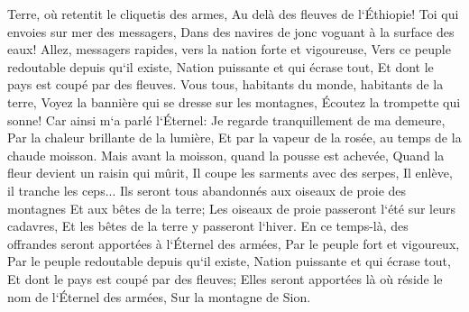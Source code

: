 \verse Terre, où retentit le cliquetis des armes, Au delà des fleuves de l`Éthiopie! 
\verse Toi qui envoies sur mer des messagers, Dans des navires de jonc voguant à la surface des eaux! Allez, messagers rapides, vers la nation forte et vigoureuse, Vers ce peuple redoutable depuis qu`il existe, Nation puissante et qui écrase tout, Et dont le pays est coupé par des fleuves. 
\verse Vous tous, habitants du monde, habitants de la terre, Voyez la bannière qui se dresse sur les montagnes, Écoutez la trompette qui sonne! 
\verse Car ainsi m`a parlé l`Éternel: Je regarde tranquillement de ma demeure, Par la chaleur brillante de la lumière, Et par la vapeur de la rosée, au temps de la chaude moisson. 
\verse Mais avant la moisson, quand la pousse est achevée, Quand la fleur devient un raisin qui mûrit, Il coupe les sarments avec des serpes, Il enlève, il tranche les ceps... 
\verse Ils seront tous abandonnés aux oiseaux de proie des montagnes Et aux bêtes de la terre; Les oiseaux de proie passeront l`été sur leurs cadavres, Et les bêtes de la terre y passeront l`hiver. 
\verse En ce temps-là, des offrandes seront apportées à l`Éternel des armées, Par le peuple fort et vigoureux, Par le peuple redoutable depuis qu`il existe, Nation puissante et qui écrase tout, Et dont le pays est coupé par des fleuves; Elles seront apportées là où réside le nom de l`Éternel des armées, Sur la montagne de Sion. 

